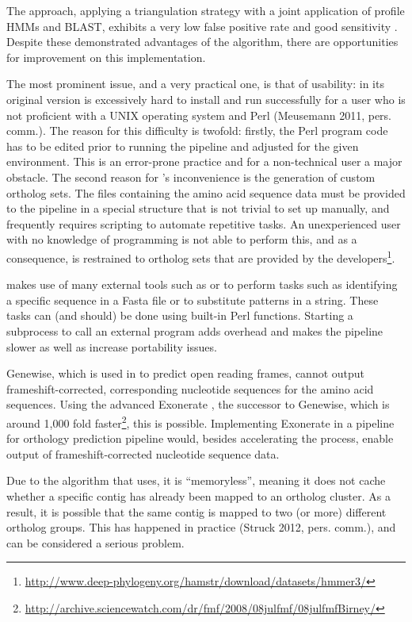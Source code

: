 The \hamstr approach, applying a triangulation strategy with a joint application
of profile HMMs and BLAST, exhibits a very low false positive rate and good
sensitivity \citep{ebersberger2009}. Despite these demonstrated advantages of
the \hamstr algorithm, there are opportunities for improvement on this
implementation.

The most prominent issue, and a very practical one, is that of usability:
\hamstr in its original version is excessively hard to install and run
successfully for a user who is not proficient with a UNIX operating system and
Perl (Meusemann 2011, pers. comm.). The reason for this difficulty is twofold:
firstly, the Perl program code has to be edited prior to running the pipeline
and adjusted for the given environment. This is an error-prone practice and for
a non-technical user a major obstacle. The second reason for \hamstr's
inconvenience is the generation of custom ortholog sets. The files containing
the amino acid sequence data must be provided to the pipeline in a special
structure that is not trivial to set up manually, and frequently requires
scripting to automate repetitive tasks. An unexperienced user with no knowledge
of programming is not able to perform this, and as a consequence, is restrained
to ortholog sets that are provided by the
developers\footnote{\url{http://www.deep-phylogeny.org/hamstr/download/datasets/hmmer3/}}.

\hamstr makes use of many external tools such as  or  to
perform tasks such as identifying a specific sequence in a Fasta file or to
substitute patterns in a string. These tasks can (and should) be done using
built-in Perl functions. Starting a subprocess to call an external program adds
overhead and makes the pipeline slower as well as increase portability issues.

Genewise, which is used in \hamstr to predict open reading frames, cannot output
frameshift-corrected, corresponding nucleotide sequences for the amino acid
sequences. Using the advanced Exonerate \citep{slater2005}, the successor to
Genewise, which is around 1,000 fold
faster\footnote{\url{http://archive.sciencewatch.com/dr/fmf/2008/08julfmf/08julfmfBirney/}},
this is possible. Implementing Exonerate in a pipeline for orthology prediction
pipeline would, besides accelerating the process, enable output of
frameshift-corrected nucleotide sequence data.

Due to the algorithm that \hamstr uses, it is ``memoryless'', meaning it does
not cache whether a specific contig has already been mapped to an ortholog
cluster. As a result, it is possible that the same contig is mapped to two (or
more) different ortholog groups. This has happened in practice (Struck 2012,
pers. comm.), and can be considered a serious problem.

